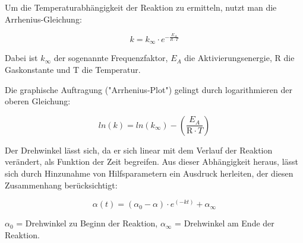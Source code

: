 Um die Temperaturabhängigkeit der Reaktion zu ermitteln, nutzt man die Arrhenius-Gleichung:

\begin{equation}
k=k_\infty \cdot e^{ - \frac{E_A}{R \cdot T}}
\label{eq:Arrheniusgleichung}
\end{equation}

Dabei ist $k_\infty$ der sogenannte Frequenzfaktor, $E_A$ die Aktivierungsenergie, R die Gaskonstante und T die Temperatur.

Die graphische Auftragung ("Arrhenius-Plot") gelingt durch logarithmieren der oberen Gleichung:

\begin{equation}
ln(k)=ln(k_\infty)-\left( \frac{E_A}{ \text{R} \cdot T} \right)
\label{eq:logarithmArrhenius}
\end{equation}

Der Drehwinkel lässt sich, da er sich linear mit dem Verlauf der Reaktion verändert, als Funktion der Zeit begreifen. Aus dieser Abhängigkeit heraus, lässt sich durch Hinzunahme von Hilfsparametern ein Ausdruck herleiten, der diesen Zusammenhang berücksichtigt:

\begin{equation}
\alpha(t)=(\alpha_0-\alpha)\cdot e^{(-kt)}+\alpha_\infty
\label{eq:winkelvontfunktion}
\end{equation}

$\alpha_0$ = Drehwinkel zu Beginn der Reaktion, $\alpha_\infty$ = Drehwinkel am Ende der Reaktion.



